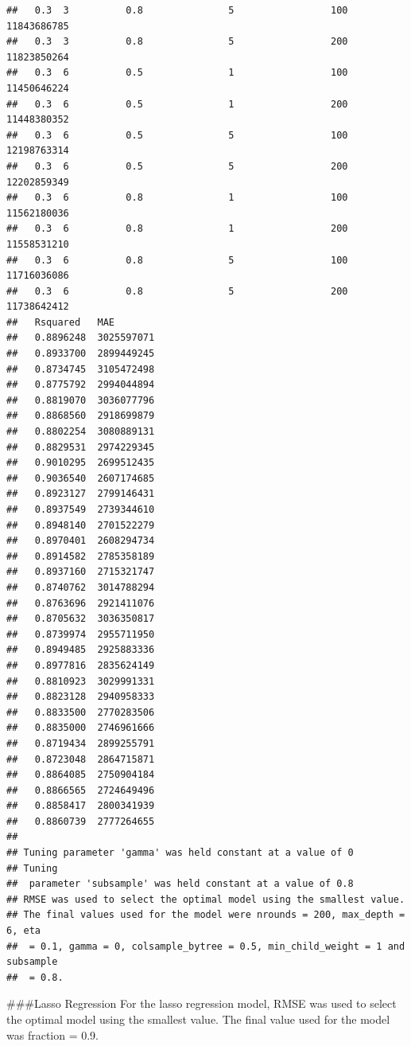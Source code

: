 \documentclass[11pt,]{article}
\newenvironment{Shaded}{\begin{snugshade}}{\end{snugshade}}
\newcommand{\KeywordTok}[1]{\textcolor[rgb]{0.13,0.29,0.53}{\textbf{#1}}}
\newcommand{\NormalTok}[1]{#1}
\newcommand{\OperatorTok}[1]{\textcolor[rgb]{0.81,0.36,0.00}{\textbf{#1}}}
\newcommand{\StringTok}[1]{\textcolor[rgb]{0.31,0.60,0.02}{#1}}
\begin{document}
\begin{verbatim}
##   0.3  3          0.8               5                 100      11843686785
##   0.3  3          0.8               5                 200      11823850264
##   0.3  6          0.5               1                 100      11450646224
##   0.3  6          0.5               1                 200      11448380352
##   0.3  6          0.5               5                 100      12198763314
##   0.3  6          0.5               5                 200      12202859349
##   0.3  6          0.8               1                 100      11562180036
##   0.3  6          0.8               1                 200      11558531210
##   0.3  6          0.8               5                 100      11716036086
##   0.3  6          0.8               5                 200      11738642412
##   Rsquared   MAE       
##   0.8896248  3025597071
##   0.8933700  2899449245
##   0.8734745  3105472498
##   0.8775792  2994044894
##   0.8819070  3036077796
##   0.8868560  2918699879
##   0.8802254  3080889131
##   0.8829531  2974229345
##   0.9010295  2699512435
##   0.9036540  2607174685
##   0.8923127  2799146431
##   0.8937549  2739344610
##   0.8948140  2701522279
##   0.8970401  2608294734
##   0.8914582  2785358189
##   0.8937160  2715321747
##   0.8740762  3014788294
##   0.8763696  2921411076
##   0.8705632  3036350817
##   0.8739974  2955711950
##   0.8949485  2925883336
##   0.8977816  2835624149
##   0.8810923  3029991331
##   0.8823128  2940958333
##   0.8833500  2770283506
##   0.8835000  2746961666
##   0.8719434  2899255791
##   0.8723048  2864715871
##   0.8864085  2750904184
##   0.8866565  2724649496
##   0.8858417  2800341939
##   0.8860739  2777264655
## 
## Tuning parameter 'gamma' was held constant at a value of 0
## Tuning
##  parameter 'subsample' was held constant at a value of 0.8
## RMSE was used to select the optimal model using the smallest value.
## The final values used for the model were nrounds = 200, max_depth = 6, eta
##  = 0.1, gamma = 0, colsample_bytree = 0.5, min_child_weight = 1 and subsample
##  = 0.8.
\end{verbatim}

\#\#\#Lasso Regression For the lasso regression model, RMSE was used to
select the optimal model using the smallest value. The final value used
for the model was fraction = 0.9.

\begin{Shaded}
\end{Shaded}
\end{document}

